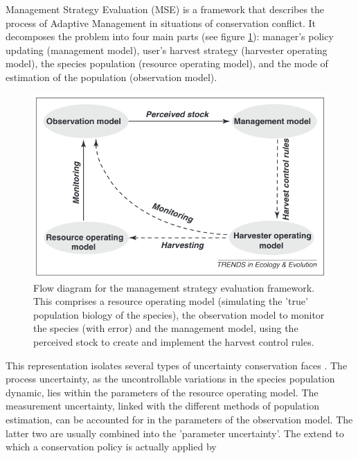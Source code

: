 \documentclass[12pt,a4paper]{article}
\begin{document}
Management Strategy Evaluation (MSE) is a framework that describes the process of Adaptive Management in situations of conservation conflict.
It decomposes the problem into four main parts (see figure \ref{msediagram}): manager's policy updating (management model), user's harvest strategy (harvester operating model), the species population (resource operating model), and the mode of estimation of the population (observation model).
\begin{figure}
	\centering
	\includegraphics[scale=0.5]{msediagram.png}
	\caption{Flow diagram for the management strategy evaluation framework. This comprises a resource operating model (simulating the 'true' population biology of the species), the observation model to monitor the species (with error) and the management model, using the perceived stock to create and implement the harvest control rules. \citep{BUNNEFELD2011441}}
	\label{msediagram}
\end{figure}
This representation isolates several types of uncertainty conservation faces \citep{BUNNEFELD2011441}.
The process uncertainty, as the uncontrollable variations in the species population dynamic, lies within the parameters of the resource operating model.
The measurement uncertainty, linked with the different methods of population estimation, can be accounted for in the parameters of the observation model.
The latter two are usually combined into the 'parameter uncertainty'.
The extend to which a conservation policy is actually applied by  
\end{document}
